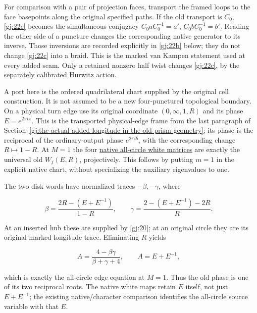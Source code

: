 For comparison with a pair of projection faces, transport the framed
loops to the face basepoints along the original specified paths.
If the old transport is \(C_0\), \eqref{gj:22c} becomes the simultaneous
conjugacy \(C_0aC_0^{-1}=a'\), \(C_0bC_0^{-1}=b'\).
Reading the other side of a puncture changes the corresponding
native generator to its inverse. Those inversions are recorded
explicitly in \eqref{gj:22b} below; they do not change \eqref{gj:22c} into a braid.
This is the marked van Kampen statement used at every added seam.
Only a retained nonzero half twist changes \eqref{gj:22c}, by the separately
calibrated Hurwitz action.

A port here is the ordered quadrilateral chart supplied by the
original cell construction. It is not assumed to be a new
four-punctured topological boundary. On a physical turn edge use its
original coordinate \((0,\infty,1,R)\) and its phase \(E=e^{2\pi ix}\).
This is the transported physical-edge frame from the last paragraph
of Section~\ref{gj:the-actual-added-longitude-in-the-old-prism-geometry}; its phase is the reciprocal of the ordinary-output
phase \(e^{2\pi ib}\), with the corresponding change \(R\mapsto1-R\).
At \(M=1\) the four \href{https://sashakolpakov.github.io/murakamis_dream/notes/actual_all_circle_geometric_characteristic.html\#the-local-face-maps}{native all-circle white matrices} are exactly the universal old \(W_j(E,R)\), projectively. This follows by putting \(m=1\) in the explicit native chart, without specializing the auxiliary eigenvalues to one.

The two disk words have normalized traces \(-\beta,-\gamma\), where

\begin{equation}\label{gj:21}
\beta=\frac{2R-(E+E^{-1})}{1-R},\qquad
 \gamma=\frac{2-(E+E^{-1})-2R}{R}.
\end{equation}

At an inserted hub these are supplied by \eqref{gj:20}; at an original circle they are its original marked longitude trace. Eliminating \(R\) yields

\begin{equation}\label{gj:22}
A=\frac{4-\beta\gamma}{\beta+\gamma+4},
 \qquad A=E+E^{-1},
\end{equation}

which is exactly the all-circle edge equation at \(M=1\). Thus the old phase is one of its two reciprocal roots. The native white maps retain \(E\) itself, not just \(E+E^{-1}\); the existing native/character comparison identifies the all-circle source variable with that \(E\).

